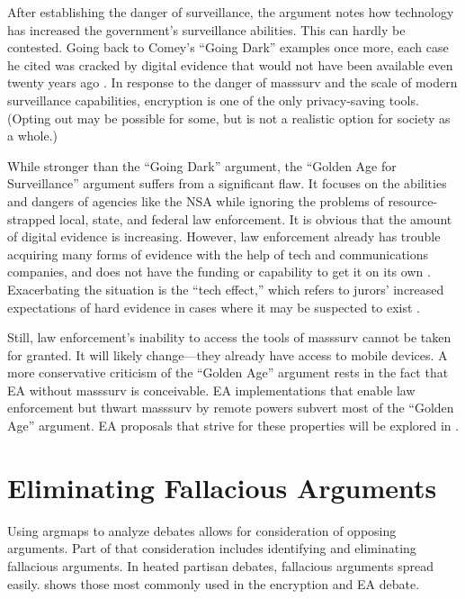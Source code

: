 After establishing the danger of surveillance, the argument notes how technology has increased the government's
surveillance abilities. This can hardly be contested. Going back to Comey's ``Going Dark'' examples once more, each case
he cited was cracked by digital evidence that would not have been available even twenty years ago \cite{comey_2014}. In
response to the danger of \ac{masssurv} and the scale of modern surveillance capabilities, encryption is one of the only
privacy-saving tools. (Opting out may be possible for some, but is not a realistic option for society as a whole.)

While stronger than the ``Going Dark'' argument, the ``Golden Age for Surveillance'' argument suffers from a significant
flaw. It focuses on the abilities and dangers of agencies like the \ac{NSA} while ignoring the problems of
resource-strapped local, state, and federal law enforcement. It is obvious that the amount of digital evidence is
increasing. However, law enforcement already has trouble acquiring many forms of evidence with the help of tech and
communications companies, and does not have the funding or capability to get it on its own \cite{carter_2018}.
Exacerbating the situation is the ``tech effect,'' which refers to jurors' increased expectations of hard evidence in cases
where it may be suspected to exist \cite{shelton_study_2006}.

Still, law enforcement's inability to access the tools of \ac{masssurv} cannot be taken for granted. It will likely
change---they already have access to mobile devices. A more conservative criticism of the ``Golden Age'' argument rests
in the fact that \ac{EA} without \ac{masssurv} is conceivable. \ac{EA} implementations that enable law enforcement but
thwart \ac{masssurv} by remote powers subvert most of the ``Golden Age'' argument. \ac{EA} proposals that strive for these
properties will be explored in .


\section{Eliminating Fallacious Arguments}

Using \acp{argmap} to analyze debates allows for consideration of opposing arguments. Part of that consideration
includes identifying and eliminating fallacious arguments. In heated partisan debates, fallacious arguments spread
easily.  shows those most commonly used in the encryption and \ac{EA} debate.

